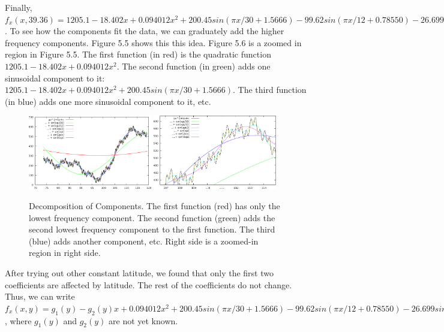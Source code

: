 \documentclass[a4paper]{article}
\begin{document}
Finally, $f_x(x,39.36) = 1205.1 -18.402x +0.094012x^2 +200.45sin(\pi
x/30+1.5666) -99.62sin(\pi x/12+0.78550) -26.699sin(\pi x/3-0.0034165)
-13.343sin(\pi x-0.0097763) +13.344sin(2\pi x-0.020612) +13.332sin(6\pi
x-0.061772)$. To see how the components fit the data, we can graduately add
the higher frequency components. Figure 5.5 shows this this idea. Figure 5.6 is
a zoomed in region in Figure 5.5. The first function (in red) is the quadratic
function $1205.1 -18.402x +0.094012x^2$. The second function (in green) adds
one sinusoidal component to it: $1205.1 -18.402x +0.094012x^2 +200.45sin(\pi
x/30+1.5666)$. The third function (in blue) adds one more sinusoidal component
to it, etc.
\begin{figure}[htb]
\begin{center}
\includegraphics[width=0.48\textwidth]{fxx-lc3.png}
\includegraphics[width=0.48\textwidth]{fxx-lc4.png}
\end{center}
\caption{Decomposition of Components.
The first function (red) has only the lowest frequency component.
The second function (green) adds the second lowest frequency component to the
first function.
The third (blue) adds another component, etc.
Right side is a zoomed-in region in right side.}
\label{fig:fxx-lc3}
\end{figure}

After trying out other constant latitude, we found that only the first two
coefficients are affected by latitude. The rest of the coefficients do not
change. Thus, we can write $f_x(x,y)=g_1(y) -g_2(y)x +0.094012x^2
+200.45sin(\pi x/30+1.5666) -99.62sin(\pi x/12+0.78550) -26.699sin(\pi
x/3-0.0034165) -13.343sin(\pi x-0.0097763) +13.344sin(2\pi x-0.020612)
+13.332sin(6\pi x-0.061772)$, where $g_1(y)$ and $g_2(y)$ are not yet known.
\end{document}
